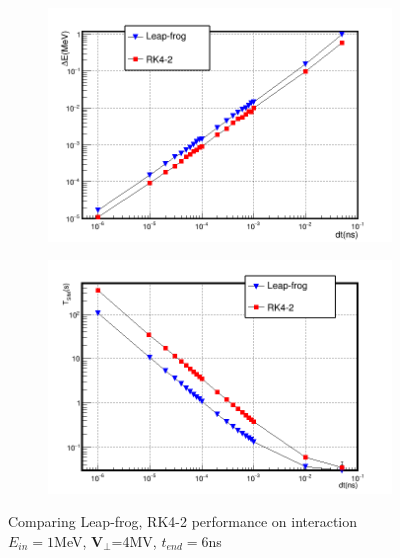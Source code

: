 \documentclass[a4paper,oneside,12pt]{report}
\numberwithin{equation}{chapter}
\begin{document}
\begin{figure}[H]
    \captionsetup[subfigure]{justification=centering}
    \captionsetup{justification=centering}
    \centering
    \begin{subfigure}{0.9\textwidth}
        \centering
        \includegraphics[width=\linewidth]{./figures/analiz/90staticE_lf_rk2_dt-E_3.png}
    \end{subfigure}
    
    \begin{subfigure}{0.9\textwidth}
        \centering
        \includegraphics[width=\linewidth]{./figures/analiz/90staticE_lf_rk2_dt-Tsim.png}
    \end{subfigure}
    \caption{Comparing Leap-frog, RK4-2 performance on \eE interaction\\ $E_{in}=1$MeV, $\textbf{V}_{\perp}$=4MV, $t_{end}=6$ns}
    \label{fig:lf_rk2_perp_stat_E_comparison}
\end{figure}
\end{document}
